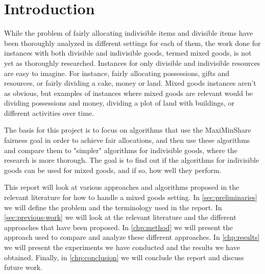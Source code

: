 \chapter{Introduction}\label{chp:introduction}


While the problem of fairly allocating indivisible items and divisible items have been thoroughly analyzed in different settings for each of them, the work done for instances with both divisible and indivisible goods, termed mixed goods, is not yet as thoroughly researched. Instances for only divisible and indivisible resources are easy to imagine. For instance, fairly allocating possessions, gifts and resources, or fairly dividing a cake, money or land. Mixed goods instances aren't as obvious, but examples of instances where mixed goods are relevant would be dividing possessions and money, dividing a plot of land with buildings, or different activities over time.

The basis for this project is to focus on algorithms that use the MaxiMinShare fairness goal in order to achieve fair allocations, and then use these algorithms and compare them to "simpler" algorithms for indivisible goods, where the research is more thorough. The goal is to find out if the algorithms for indivisible goods can be used for mixed goods, and if so, how well they perform.


This report will look at various approaches and algorithms proposed in the relevant literature for how to handle a mixed goods setting. In \autoref{sec:preliminaries} we will define the problem and the terminology used in the report. In \autoref{sec:previous-work} we will look at the relevant literature and the different approaches that have been proposed. In \autoref{chp:method} we will present the approach used to compare and analyze these different approaches. In \autoref{chp:results} we will present the experiments we have conducted and the results we have obtained. Finally, in \autoref{chp:conclusion} we will conclude the report and discuss future work.



